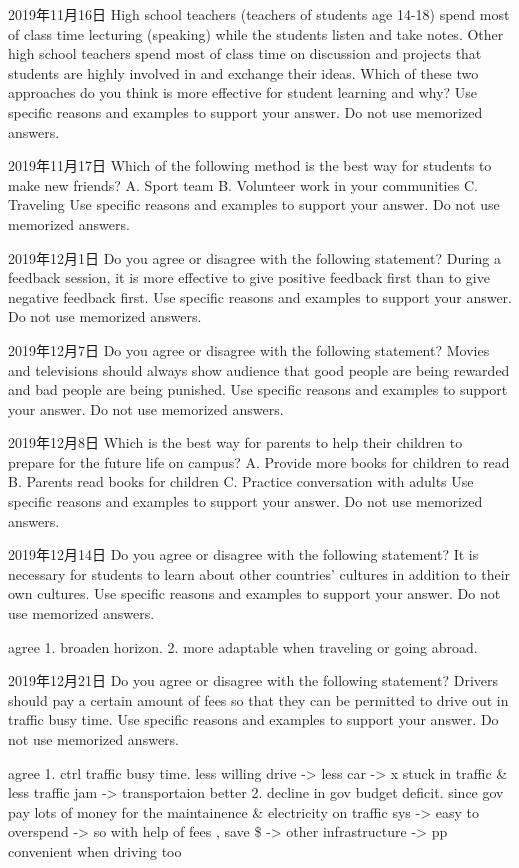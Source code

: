 2019年11月16日
High school teachers (teachers of students age 14-18) spend most of class time lecturing (speaking) while the students listen and take notes. Other high school teachers spend most of class time on discussion and projects that students are highly involved in and exchange their ideas. Which of these two approaches do you think is more effective for student learning and why?
Use specific reasons and examples to support your answer. Do not use memorized answers.

2019年11月17日
Which of the following method is the best way for students to make new friends?
A. Sport team
B. Volunteer work in your communities
C. Traveling
Use specific reasons and examples to support your answer. Do not use memorized answers.

2019年12月1日
Do you agree or disagree with the following statement?
During a feedback session, it is more effective to give positive feedback first than to give negative feedback first.
Use specific reasons and examples to support your answer. Do not use memorized answers.

2019年12月7日
Do you agree or disagree with the following statement?
Movies and televisions should always show audience that good people are being rewarded and bad people are being punished.
Use specific reasons and examples to support your answer. Do not use memorized answers.

2019年12月8日
Which is the best way for parents to help their children to prepare for the future life on campus?
A. Provide more books for children to read
B. Parents read books for children
C. Practice conversation with adults
Use specific reasons and examples to support your answer. Do not use memorized answers.


2019年12月14日
Do you agree or disagree with the following statement?
It is necessary for students to learn about other countries' cultures in addition to their own cultures.
Use specific reasons and examples to support your answer. Do not use memorized answers.

agree
1. broaden horizon.
2. more adaptable when traveling or going abroad.

2019年12月21日
Do you agree or disagree with the following statement?
Drivers should pay a certain amount of fees so that they can be permitted to drive out in traffic busy time.
Use specific reasons and examples to support your answer. Do not use memorized answers.

agree
1. ctrl traffic busy time. less willing drive -> less car -> x stuck in traffic & less traffic jam -> transportaion better
2. decline in gov budget deficit. since gov pay lots of money for the maintainence & electricity on traffic sys -> easy to overspend -> so with help of fees , save \$ -> other infrastructure -> pp convenient when driving too